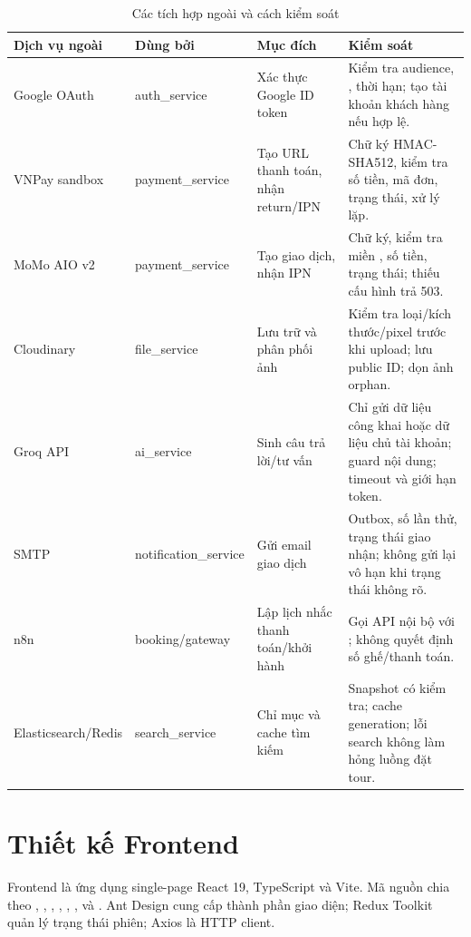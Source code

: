 \begin{table}[H]
\centering
\caption{Các tích hợp ngoài và cách kiểm soát}
\label{tab:tich-hop}
\small
\begin{tabularx}{\textwidth}{@{}L{2.6cm}L{3.1cm}L{3.4cm}Y@{}}
\toprule
\textbf{Dịch vụ ngoài} & \textbf{Dùng bởi} & \textbf{Mục đích} & \textbf{Kiểm soát}\\
\midrule
Google OAuth & auth\_service & Xác thực Google ID token & Kiểm tra audience, , thời hạn; tạo tài khoản khách hàng nếu hợp lệ.\\
VNPay sandbox & payment\_service & Tạo URL thanh toán, nhận return/IPN & Chữ ký HMAC-SHA512, kiểm tra số tiền, mã đơn, trạng thái, xử lý lặp.\\
MoMo AIO v2 & payment\_service & Tạo giao dịch, nhận IPN & Chữ ký, kiểm tra miền , số tiền, trạng thái; thiếu cấu hình trả 503.\\
Cloudinary & file\_service & Lưu trữ và phân phối ảnh & Kiểm tra loại/kích thước/pixel trước khi upload; lưu public ID; dọn ảnh orphan.\\
Groq API & ai\_service & Sinh câu trả lời/tư vấn & Chỉ gửi dữ liệu công khai hoặc dữ liệu chủ tài khoản; guard nội dung; timeout và giới hạn token.\\
SMTP & notification\_service & Gửi email giao dịch & Outbox, số lần thử, trạng thái giao nhận; không gửi lại vô hạn khi trạng thái không rõ.\\
n8n & booking/gateway & Lập lịch nhắc thanh toán/khởi hành & Gọi API nội bộ với ; không quyết định số ghế/thanh toán.\\
Elasticsearch/\hspace{0pt}Redis & search\_service & Chỉ mục và cache tìm kiếm & Snapshot có kiểm tra; cache generation; lỗi search không làm hỏng luồng đặt tour.\\
\bottomrule
\end{tabularx}
\end{table}

\section{Thiết kế Frontend}
\label{sec:thiet-ke-frontend}

Frontend là ứng dụng single-page React 19, TypeScript và Vite. Mã nguồn chia theo , , , , , ,  và . Ant Design cung cấp thành phần giao diện; Redux Toolkit quản lý trạng thái phiên; Axios là HTTP client.

